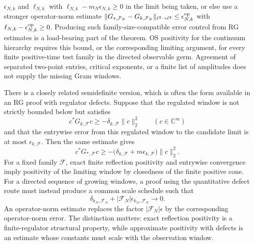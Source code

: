\(\epsilon_{N,k}\) and \(\ell_{N,k}\) with
\(\ell_{N,k}-m_N\epsilon_{N,k}\ge0\) in the limit being taken, or else use a
stronger operator-norm estimate
\(\|G_{\ast,\mathcal F_N}-G_{k,\mathcal F_N}\|_{\ell^2\to\ell^2}
\le\epsilon^{\rm op}_{N,k}\) with
\(\ell_{N,k}-\epsilon^{\rm op}_{N,k}\ge0\).  Producing such
family-size-compatible error control from RG estimates is a load-bearing
part of the theorem.  OS positivity for the continuum hierarchy requires
this bound, or the corresponding limiting argument, for every finite
positive-time test family in the directed observable germ.  Agreement of
separated two-point entries, critical exponents, or a finite list of
amplitudes does not supply the missing Gram windows.

There is a closely related semidefinite version, which is often the form
available in an RG proof with regulator defects.  Suppose that the regulated
window is not strictly bounded below but satisfies
\[
  c^\ast G_{k,\mathcal F}c\ge -\delta_{k,\mathcal F}\|c\|_2^2
  \qquad(c\in\mathbb C^m)
\]
and that the entrywise error from this regulated window to the candidate
limit is at most \(\epsilon_{k,\mathcal F}\).  Then the same estimate gives
\begin{equation}
  c^\ast G_{\ast,\mathcal F}c
  \ge
  -\bigl(\delta_{k,\mathcal F}+m\epsilon_{k,\mathcal F}\bigr)\|c\|_2^2 .
  \label{eq:rg-approximate-os-positivity-defect-budget}
\end{equation}
For a fixed family \(\mathcal F\), exact finite reflection positivity and
entrywise convergence imply positivity of the limiting window by closedness
of the finite positive cone.  For a directed sequence of growing windows, a
proof using the quantitative defect route must instead produce a common
scale schedule such that
\[
  \delta_{k_N,\mathcal F_N}
  +
  |\mathcal F_N|\epsilon_{k_N,\mathcal F_N}
  \longrightarrow0 .
\]
An operator-norm estimate replaces the factor
\(|\mathcal F_N|\epsilon\) by the corresponding operator-norm error.  The
distinction matters: exact reflection positivity is a finite-regulator
structural property, while approximate positivity with defects is an
estimate whose constants must scale with the observation window.

